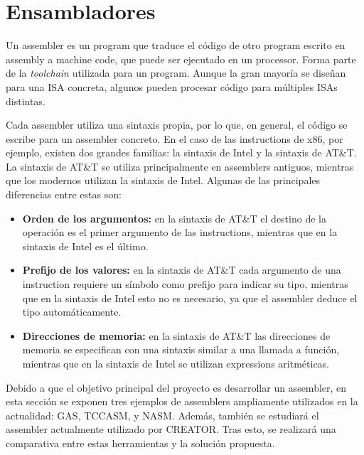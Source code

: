 
\section{Ensambladores}\label{sec:assemblers}

Un \gls{assembler} es un \gls{program} que traduce el código de otro
\gls{program} escrito en \gls{assembly} a \gls{machine code}, que puede ser
ejecutado en un \gls{processor}. Forma parte de la \textit{\gls{toolchain}} utilizada
para  un \gls{program}. Aunque la gran mayoría se
diseñan para una \gls{ISA} concreta, algunos pueden procesar código para
múltiples \glspl{ISA} distintas.

Cada \gls{assembler} utiliza una sintaxis propia, por lo que, en general, el
código se escribe para un \gls{assembler} concreto. En el caso de las
\glspl{instruction} de x86, por ejemplo, existen dos grandes familias: la
sintaxis de Intel y la sintaxis de AT\&T. La sintaxis de AT\&T se utiliza
principalmente en \glspl{assembler} antiguos, mientras que los modernos utilizan
la sintaxis de Intel. Algunas de las principales diferencias entre estas son:
\parencite{assembler-usage}

\begin{itemize}
    \item \textbf{Orden de los argumentos:} en la sintaxis de AT\&T el destino
    de la operación es el primer argumento de las \glspl{instruction}, mientras
    que en la sintaxis de Intel es el último.
    \item \textbf{Prefijo de los valores:} en la sintaxis de AT\&T cada
    argumento de una \gls{instruction} requiere un símbolo como prefijo para
    indicar su tipo, mientras que en la sintaxis de Intel esto no es necesario,
    ya que el \gls{assembler} deduce el tipo automáticamente.
    \item \textbf{Direcciones de memoria:} en la sintaxis de AT\&T las
    direcciones de memoria se especifican con una sintaxis similar a una llamada
    a función, mientras que en la sintaxis de Intel se utilizan \glspl{expression}
    aritméticas.
\end{itemize}

Debido a que el objetivo principal del proyecto es desarrollar un
\gls{assembler}, en esta sección se exponen tres ejemplos de \glspl{assembler}
ampliamente utilizados en la actualidad: \gls{GAS}, TCCASM, y NASM. Además,
también se estudiará el \gls{assembler} actualmente utilizado por CREATOR. Tras
esto, se realizará una comparativa entre estas herramientas y la solución
propuesta.


